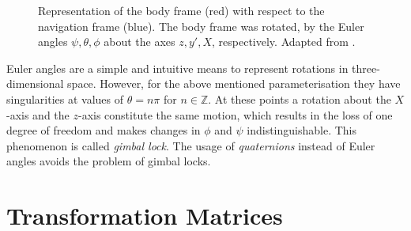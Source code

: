 \begin{figure}[ht]
\centering
{}
\caption{Representation of the body frame (red) with respect to the navigation frame (blue). The body frame was rotated, by the Euler angles $\psi, \theta, \phi$ about the axes $z, y', X$, respectively. Adapted from \cite{Wiki_taitbryan}.} \label{fig:Euler_angles}
\end{figure}

Euler angles are a simple and intuitive means to represent rotations in three-dimensional space. However, for the above mentioned parameterisation they have singularities at values of $\theta = n \pi$ for $n \in \mathbb{Z}$. At these points a rotation about the $X$-axis and the $z$-axis constitute the same motion, which results in the loss of one degree of freedom and makes changes in $\phi$ and $\psi$ indistinguishable. This phenomenon is called \emph{gimbal lock}. The usage of \emph{quaternions} instead of Euler angles avoids the problem of gimbal locks.

\section{Transformation Matrices}

